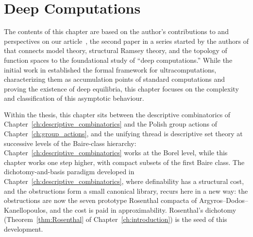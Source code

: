 
\chapter{Deep Computations}\label{ch:deep_computations}

The contents of this chapter are based on the author's contributions to and perspectives on our article~\cite{Duenezetal2026}, the second paper in a series started by the authors of \cite{alva2024approximability} that connects model theory, structural Ramsey theory, and the topology of function spaces to the foundational study of ``deep computations.''
While the initial work in \cite{alva2024approximability} established the formal framework for ultracomputations, characterizing them as accumulation points of standard computations and proving the existence of deep equilibria, this chapter focuses on the complexity and classification of this asymptotic behaviour.

Within the thesis, this chapter sits between the descriptive combinatorics of Chapter~\ref{ch:descriptive_combinatorics} and the Polish group actions of Chapter~\ref{ch:group_actions}, and the unifying thread is descriptive set theory at successive levels of the Baire-class hierarchy: Chapter~\ref{ch:descriptive_combinatorics} works at the Borel level, while this chapter works one step higher, with compact subsets of the first Baire class.
The dichotomy-and-basis paradigm developed in Chapter~\ref{ch:descriptive_combinatorics}, where definability has a structural cost, and the obstructions form a small canonical library, recurs here in a new way: the obstructions are now the seven prototype Rosenthal compacta of Argyros--Dodos--Kanellopoulos, and the cost is paid in approximability.
Rosenthal's dichotomy (Theorem~\ref{thm:Rosenthal} of Chapter~\ref{ch:introduction}) is the seed of this development.





